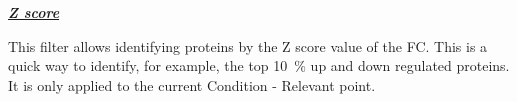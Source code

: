\textbf{\textit{\underline{Z score}}}

This filter allows identifying proteins by the Z score value of the FC. This is a
quick way to identify, for example, the top \SI{10}{\percent} up and down regulated
proteins. It is only applied to the current Condition - Relevant point.


































